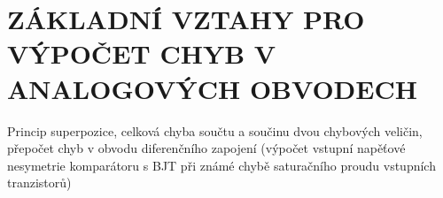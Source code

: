 \section{ZÁKLADNÍ VZTAHY PRO VÝPOČET CHYB V ANALOGOVÝCH OBVODECH }
Princip superpozice, celková chyba součtu a součinu dvou chybových veličin, přepočet chyb v obvodu diferenčního zapojení (výpočet vstupní napěťové nesymetrie komparátoru s BJT při známé chybě saturačního proudu vstupních tranzistorů)